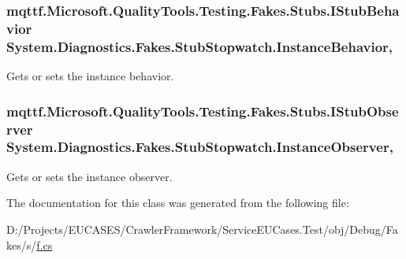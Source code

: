 \hypertarget{class_system_1_1_diagnostics_1_1_fakes_1_1_stub_stopwatch_a52d4d8afcaa7985a187478fd05a6d057}{
\subsubsection[{Instance\-Behavior}]{\setlength{\rightskip}{0pt plus 5cm}mqttf.\-Microsoft.\-Quality\-Tools.\-Testing.\-Fakes.\-Stubs.\-I\-Stub\-Behavior System.\-Diagnostics.\-Fakes.\-Stub\-Stopwatch.\-Instance\-Behavior\hspace{0.3cm}{\ttfamily [get]}, {\ttfamily [set]}}}\label{class_system_1_1_diagnostics_1_1_fakes_1_1_stub_stopwatch_a52d4d8afcaa7985a187478fd05a6d057}


Gets or sets the instance behavior.

\hypertarget{class_system_1_1_diagnostics_1_1_fakes_1_1_stub_stopwatch_a76018a1e27d81d0cc65fe51bc74afc1a}{
\subsubsection[{Instance\-Observer}]{\setlength{\rightskip}{0pt plus 5cm}mqttf.\-Microsoft.\-Quality\-Tools.\-Testing.\-Fakes.\-Stubs.\-I\-Stub\-Observer System.\-Diagnostics.\-Fakes.\-Stub\-Stopwatch.\-Instance\-Observer\hspace{0.3cm}{\ttfamily [get]}, {\ttfamily [set]}}}\label{class_system_1_1_diagnostics_1_1_fakes_1_1_stub_stopwatch_a76018a1e27d81d0cc65fe51bc74afc1a}


Gets or sets the instance observer.



The documentation for this class was generated from the following file\-:\begin{DoxyCompactItemize}
\item 
D\-:/\-Projects/\-E\-U\-C\-A\-S\-E\-S/\-Crawler\-Framework/\-Service\-E\-U\-Cases.\-Test/obj/\-Debug/\-Fakes/s/\hyperlink{s_2f_8cs}{f.\-cs}\end{DoxyCompactItemize}
